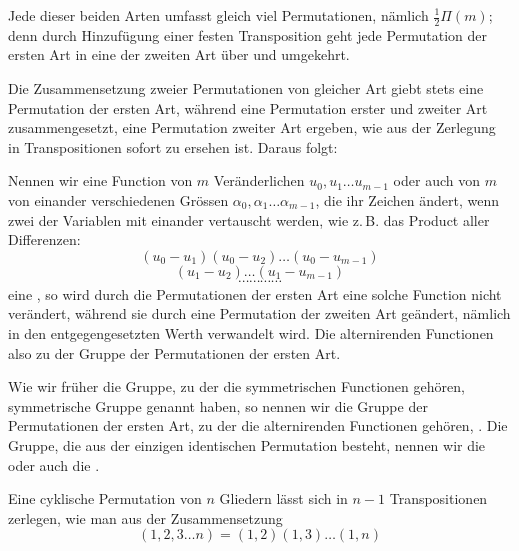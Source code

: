 

Jede dieser beiden Arten umfasst gleich viel Permutationen, nämlich $\frac{1}{2}\Pi(m)$; denn durch Hinzufügung einer festen Transposition geht jede Permutation der ersten Art in eine der zweiten Art über und umgekehrt.

Die Zusammensetzung zweier Permutationen von gleicher Art giebt stets eine Permutation der ersten Art, während eine Permutation erster und zweiter Art zusammengesetzt, eine Permutation zweiter Art ergeben, wie aus der Zerlegung in Transpositionen sofort zu ersehen ist. Daraus folgt:


Nennen wir eine Function von $m$ Veränderlichen $u_0, u_1 \dots u_{m-1}$ oder auch von $m$ von einander verschiedenen Grössen $\alpha_0, \alpha_1 \dots \alpha_{m-1}$, die ihr Zeichen ändert, wenn zwei der Variablen mit einander vertauscht werden, wie z.\,B. das Product aller Differenzen:
\[
(u_0 - u_1)(u_0 - u_2) \dots (u_0 - u_{m-1})
\]
\[
(u_1 - u_2) \dots (u_1 - u_{m-1})
\]
\[
\cdots\cdots\cdots\cdots
\]
eine , so wird durch die Permutationen der ersten Art eine solche Function nicht verändert, während sie durch eine Permutation der zweiten Art geändert, nämlich in den entgegengesetzten Werth verwandelt wird. Die alternirenden Functionen  also zu der Gruppe der Permutationen der ersten Art.

Wie wir früher die Gruppe, zu der die symmetrischen Functionen gehören, symmetrische Gruppe genannt haben, so nennen wir die Gruppe der Permutationen der ersten Art, zu der die alternirenden Functionen gehören, . Die Gruppe, die aus der einzigen identischen Permutation besteht, nennen wir die  oder auch die .

Eine cyklische Permutation von $n$ Gliedern lässt sich in $n - 1$ Transpositionen zerlegen, wie man aus der Zusammensetzung
\[
(1, 2, 3 \dots n) = (1, 2)(1, 3) \dots (1, n)
\]
